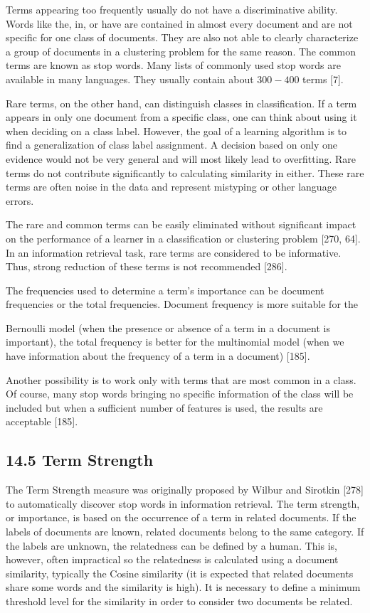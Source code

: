 \documentclass[10pt]{book}
\begin{document}
Terms appearing too frequently usually do not have a discriminative ability. Words like the, in, or have are contained in almost every document and are not specific for one class of documents. They are also not able to clearly characterize a group of documents in a clustering problem for the same reason. The common terms are known as stop words. Many lists of commonly used stop words are available in many languages. They usually contain about $300-400$ terms [7].

Rare terms, on the other hand, can distinguish classes in classification. If a term appears in only one document from a specific class, one can think about using it when deciding on a class label. However, the goal of a learning algorithm is to find a generalization of class label assignment. A decision based on only one evidence would not be very general and will most likely lead to overfitting. Rare terms do not contribute significantly to calculating similarity in either. These rare terms are often noise in the data and represent mistyping or other language errors.

The rare and common terms can be easily eliminated without significant impact on the performance of a learner in a classification or clustering problem [270, 64]. In an information retrieval task, rare terms are considered to be informative. Thus, strong reduction of these terms is not recommended [286].

The frequencies used to determine a term's importance can be document frequencies or the total frequencies. Document frequency is more suitable for the

Bernoulli model (when the presence or absence of a term in a document is important), the total frequency is better for the multinomial model (when we have information about the frequency of a term in a document) [185].

Another possibility is to work only with terms that are most common in a class. Of course, many stop words bringing no specific information of the class will be included but when a sufficient number of features is used, the results are acceptable [185].

\subsection*{14.5 Term Strength}
The Term Strength measure was originally proposed by Wilbur and Sirotkin [278] to automatically discover stop words in information retrieval. The term strength, or importance, is based on the occurrence of a term in related documents. If the labels of documents are known, related documents belong to the same category. If the labels are unknown, the relatedness can be defined by a human. This is, however, often impractical so the relatedness is calculated using a document similarity, typically the Cosine similarity (it is expected that related documents share some words and the similarity is high). It is necessary to define a minimum threshold level for the similarity in order to consider two documents be related.
\end{document}
